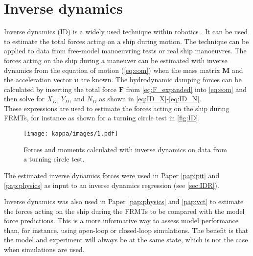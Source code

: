 \section{Inverse dynamics} \label{sec:ID}
Inverse dynamics (ID) is a widely used technique within robotics \citep{faber_inverse_2018, haningerNonparametricInverseDynamic2019, mastalliInverseDynamicsMPCNullspace2023, sunHighorderInverseDynamics2023, kurtzInverseDynamicsTrajectory2023}. It can be used to estimate the total forces acting on a ship during motion. The technique can be applied to data from free-model manoeuvring tests or real ship manoeuvres. The forces acting on the ship during a maneuver can be estimated with inverse dynamics from the equation of motion (\autoref{eq:eom}) when the mass matrix $\mathbf{M}$ and the acceleration vector $\pmb{\bm{\dot{\upsilon}}}$ are known. The hydrodynamic damping forces can be calculated by inserting the total force $\mathbf{F}$ from \autoref{eq:F_expanded} into \autoref{eq:eom} and then solve for $X_D$, $Y_D$, and $N_D$ as shown in \autoref{eq:ID_X}-\autoref{eq:ID_N}.
\begin{equation}
    \label{eq:ID_X}
    
\end{equation}
\begin{equation}
    \label{eq:ID_Y}
    
\end{equation}
\begin{equation}
    \label{eq:ID_N}
    
\end{equation}
These expressions are used to estimate the forces acting on the ship during FRMTs, for instance as shown for a turning circle test in \autoref{fig:ID}.
\begin{figure}[H]
    \centering
    \texttt{[image: kappa/images/1.pdf]}
    \caption{Forces and moments calculated with inverse dynamics on data from a turning circle test.}
    \label{fig:ID}
\end{figure}

The estimated inverse dynamics forces were used in Paper \ref{pap:pit} and \ref{pap:physics} as input to an inverse dynamics regression (see \autoref{sec:IDR}). 

Inverse dynamics was also used in Paper \ref{pap:physics} and \ref{pap:vct} to estimate the forces acting on the ship during the FRMTs to be compared with the model force predictions. This is a more informative way to assess model performance than, for instance, using open-loop or closed-loop simulations. The benefit is that the model and experiment will always be at the same state, which is not the case when simulations are used.